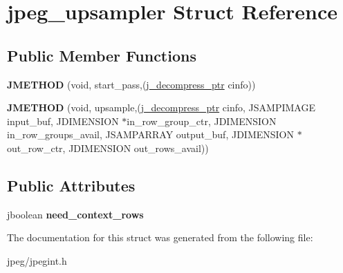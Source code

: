 \hypertarget{structjpeg__upsampler}{}\section{jpeg\+\_\+upsampler Struct Reference}
\label{structjpeg__upsampler}
\subsection*{Public Member Functions}
\begin{DoxyCompactItemize}
\item 
{\bfseries J\+M\+E\+T\+H\+OD} (void, start\+\_\+pass,(\hyperlink{structjpeg__decompress__struct}{j\+\_\+decompress\+\_\+ptr} cinfo))\hypertarget{structjpeg__upsampler_a01ac725bfe78e05e7671547504a95346}{}\label{structjpeg__upsampler_a01ac725bfe78e05e7671547504a95346}

\item 
{\bfseries J\+M\+E\+T\+H\+OD} (void, upsample,(\hyperlink{structjpeg__decompress__struct}{j\+\_\+decompress\+\_\+ptr} cinfo,   J\+S\+A\+M\+P\+I\+M\+A\+GE input\+\_\+buf,   J\+D\+I\+M\+E\+N\+S\+I\+ON $\ast$in\+\_\+row\+\_\+group\+\_\+ctr,   J\+D\+I\+M\+E\+N\+S\+I\+ON in\+\_\+row\+\_\+groups\+\_\+avail,   J\+S\+A\+M\+P\+A\+R\+R\+AY output\+\_\+buf,   J\+D\+I\+M\+E\+N\+S\+I\+ON $\ast$out\+\_\+row\+\_\+ctr,   J\+D\+I\+M\+E\+N\+S\+I\+ON out\+\_\+rows\+\_\+avail))\hypertarget{structjpeg__upsampler_ad3f085ee8a11e44796cbea4de97bbf42}{}\label{structjpeg__upsampler_ad3f085ee8a11e44796cbea4de97bbf42}

\end{DoxyCompactItemize}
\subsection*{Public Attributes}
\begin{DoxyCompactItemize}
\item 
jboolean {\bfseries need\+\_\+context\+\_\+rows}\hypertarget{structjpeg__upsampler_afd0219785b7a76a41303b7442adc17de}{}\label{structjpeg__upsampler_afd0219785b7a76a41303b7442adc17de}

\end{DoxyCompactItemize}


The documentation for this struct was generated from the following file\+:\begin{DoxyCompactItemize}
\item 
jpeg/jpegint.\+h\end{DoxyCompactItemize}
